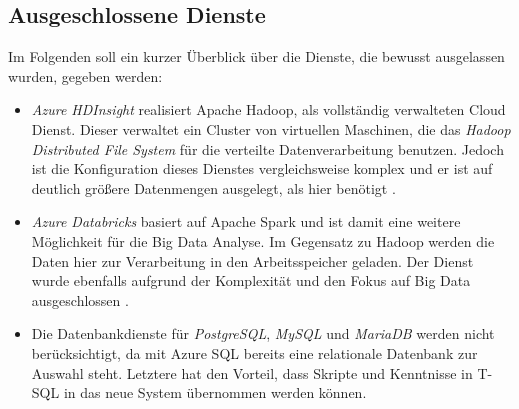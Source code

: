 \subsection{Ausgeschlossene Dienste} \label{sec:grundlagen:azure_dienste:ausgeschlosseneDienste}
Im Folgenden soll ein kurzer Überblick über die Dienste, die bewusst ausgelassen wurden, gegeben werden:
\begin{itemize}
\item \textit{Azure HDInsight} realisiert Apache Hadoop, als vollständig verwalteten Cloud Dienst. Dieser verwaltet ein Cluster von virtuellen Maschinen, die das \textit{Hadoop Distributed File System} für die verteilte Datenverarbeitung benutzen. Jedoch ist die Konfiguration dieses Dienstes vergleichsweise komplex und er ist auf deutlich größere Datenmengen ausgelegt, als hier benötigt \cite[vgl.][]{klein_iot_2017}.
\item \textit{Azure Databricks} basiert auf Apache Spark und ist damit eine weitere Möglichkeit für die Big Data Analyse. Im Gegensatz zu Hadoop werden die Daten hier zur Verarbeitung in den Arbeitsspeicher geladen. Der Dienst wurde ebenfalls aufgrund der Komplexität und den Fokus auf Big Data ausgeschlossen \cite[vgl.][]{soh_data_2020}.
\item Die Datenbankdienste für \textit{PostgreSQL}, \textit{MySQL} und \textit{MariaDB} werden nicht berücksichtigt, da mit Azure SQL bereits eine relationale Datenbank zur Auswahl steht. Letztere hat den Vorteil, dass Skripte und Kenntnisse in T-SQL in das neue System übernommen werden können.
\end{itemize}